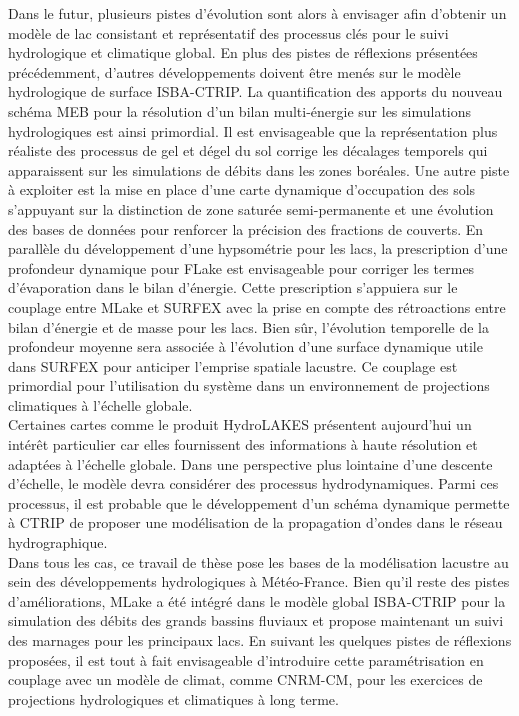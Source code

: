 Dans le futur, plusieurs pistes d'évolution sont alors à envisager afin d'obtenir un modèle de lac consistant et représentatif des processus clés pour le suivi hydrologique et climatique global. En plus des pistes de réflexions présentées précédemment, d'autres développements doivent être menés sur le modèle hydrologique de surface ISBA-CTRIP. La quantification des apports du nouveau schéma MEB pour la résolution d'un bilan multi-énergie sur les simulations hydrologiques est ainsi primordial. Il est envisageable que la représentation plus réaliste des processus de gel et dégel du sol corrige les décalages temporels qui apparaissent sur les simulations de débits dans les zones boréales. Une autre piste à exploiter est la mise en place d'une carte dynamique d'occupation des sols s'appuyant sur la distinction de zone saturée semi-permanente \citep{pekel2016} et une évolution des bases de données pour renforcer la précision des fractions de couverts. En parallèle du développement d'une hypsométrie pour les lacs, la prescription d'une profondeur dynamique pour FLake est envisageable pour corriger les termes d'évaporation dans le bilan d'énergie. Cette prescription s'appuiera sur le couplage entre MLake et SURFEX avec la prise en compte des rétroactions entre bilan d'énergie et de masse pour les lacs. Bien sûr, l'évolution temporelle de la profondeur moyenne sera associée à l'évolution d'une surface dynamique utile dans SURFEX pour anticiper l'emprise spatiale lacustre. Ce couplage est primordial pour l’utilisation du système dans un environnement de projections climatiques à l’échelle globale. \\ Certaines cartes comme le produit HydroLAKES \citep{messager2016} présentent aujourd'hui un intérêt particulier car elles fournissent des informations à haute résolution et adaptées à l'échelle globale. Dans une perspective plus lointaine d'une descente d'échelle, le modèle devra considérer des processus hydrodynamiques. Parmi ces processus, il est probable que le développement d'un schéma dynamique permette à CTRIP de proposer une modélisation de la propagation d'ondes dans le réseau hydrographique.\\

Dans tous les cas, ce travail de thèse pose les bases de la modélisation lacustre au sein des développements hydrologiques à Météo-France. Bien qu'il reste des pistes d'améliorations, MLake a été intégré dans le modèle global ISBA-CTRIP pour la simulation des débits des grands bassins fluviaux et propose maintenant un suivi des marnages pour les principaux lacs. En suivant les quelques pistes de réflexions proposées, il est tout à fait envisageable d'introduire cette paramétrisation en couplage avec un modèle de climat, comme CNRM-CM, pour les exercices de projections hydrologiques et climatiques à long terme.
